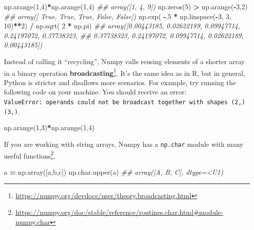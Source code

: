 \documentclass[
  12pt,
  krantz2]{krantz}
\makeatletter
\newenvironment{Shaded}{\begin{snugshade}}{\end{snugshade}}
\newcommand{\CommentTok}[1]{\textcolor[rgb]{0.37,0.37,0.37}{\textit{#1}}}
\newcommand{\DecValTok}[1]{\textcolor[rgb]{0.06,0.06,0.06}{#1}}
\newcommand{\FloatTok}[1]{\textcolor[rgb]{0.06,0.06,0.06}{#1}}
\newcommand{\NormalTok}[1]{#1}
\newcommand{\OperatorTok}[1]{\textcolor[rgb]{0.43,0.43,0.43}{\textbf{#1}}}
\newcommand{\StringTok}[1]{\textcolor[rgb]{0.5,0.5,0.5}{#1}}
\renewcommand{\href}[2]{#2\footnote{\url{#1}}}
\newenvironment{kframe}{%
\medskip{}
\setlength{\fboxsep}{.8em}
 \def\at@end@of@kframe{}%
 \ifinner\ifhmode%
  \def\at@end@of@kframe{\end{minipage}}%
  \begin{minipage}{\columnwidth}%
 \fi\fi%
 \def\FrameCommand##1{\hskip\@totalleftmargin \hskip-\fboxsep
 \colorbox{shadecolor}{##1}\hskip-\fboxsep
     \hskip-\linewidth \hskip-\@totalleftmargin \hskip\columnwidth}%
 \MakeFramed {\advance\hsize-\width
   \@totalleftmargin\z@ \linewidth\hsize
   \@setminipage}}%
 {\par\unskip\endMakeFramed%
 \at@end@of@kframe}
\renewenvironment{Shaded}{\begin{kframe}}{\end{kframe}}
\makeatother
\begin{document}
\begin{Shaded}
\begin{Highlighting}[]
\NormalTok{np.arange(}\DecValTok{1}\NormalTok{,}\DecValTok{4}\NormalTok{)}\OperatorTok{*}\NormalTok{np.arange(}\DecValTok{1}\NormalTok{,}\DecValTok{4}\NormalTok{)}
\CommentTok{\#\# array([1, 4, 9])}
\NormalTok{np.zeros(}\DecValTok{5}\NormalTok{) }\OperatorTok{\textgreater{}}\NormalTok{ np.arange(}\OperatorTok{{-}}\DecValTok{3}\NormalTok{,}\DecValTok{2}\NormalTok{)}
\CommentTok{\#\# array([ True,  True,  True, False, False])}
\NormalTok{np.exp( }\OperatorTok{{-}}\FloatTok{.5} \OperatorTok{*}\NormalTok{ np.linspace(}\OperatorTok{{-}}\DecValTok{3}\NormalTok{, }\DecValTok{3}\NormalTok{, }\DecValTok{10}\NormalTok{)}\OperatorTok{**}\DecValTok{2}\NormalTok{) }\OperatorTok{/}\NormalTok{ np.sqrt( }\DecValTok{2} \OperatorTok{*}\NormalTok{ np.pi)}
\CommentTok{\#\# array([0.00443185, 0.02622189, 0.09947714, 0.24197072, 0.37738323,}
\CommentTok{\#\#        0.37738323, 0.24197072, 0.09947714, 0.02622189, 0.00443185])}
\end{Highlighting}
\end{Shaded}

Instead of calling it ``recycling'', Numpy calls reusing elements of a shorter array in a binary operation \href{https://numpy.org/devdocs/user/theory.broadcasting.html}{\textbf{broadcasting}}. It's the same idea as in R, but in general, Python is stricter and disallows more scenarios. For example, try running the following code on your machine. You should receive an error: \texttt{ValueError:\ operands\ could\ not\ be\ broadcast\ together\ with\ shapes\ (2,)\ (3,)}.

\begin{Shaded}
\begin{Highlighting}[]
\NormalTok{np.arange(}\DecValTok{1}\NormalTok{,}\DecValTok{3}\NormalTok{)}\OperatorTok{*}\NormalTok{np.arange(}\DecValTok{1}\NormalTok{,}\DecValTok{4}\NormalTok{)}
\end{Highlighting}
\end{Shaded}

If you are working with string arrays, Numpy has a \href{https://numpy.org/doc/stable/reference/routines.char.html\#module-numpy.char}{\texttt{np.char} module with many useful functions}.

\begin{Shaded}
\begin{Highlighting}[]
\NormalTok{a }\OperatorTok{=}\NormalTok{ np.array([}\StringTok{\textquotesingle{}a\textquotesingle{}}\NormalTok{,}\StringTok{\textquotesingle{}b\textquotesingle{}}\NormalTok{,}\StringTok{\textquotesingle{}c\textquotesingle{}}\NormalTok{])}
\NormalTok{np.char.upper(a)}
\CommentTok{\#\# array([\textquotesingle{}A\textquotesingle{}, \textquotesingle{}B\textquotesingle{}, \textquotesingle{}C\textquotesingle{}], dtype=\textquotesingle{}\textless{}U1\textquotesingle{})}
\end{Highlighting}
\end{Shaded}
\end{document}
